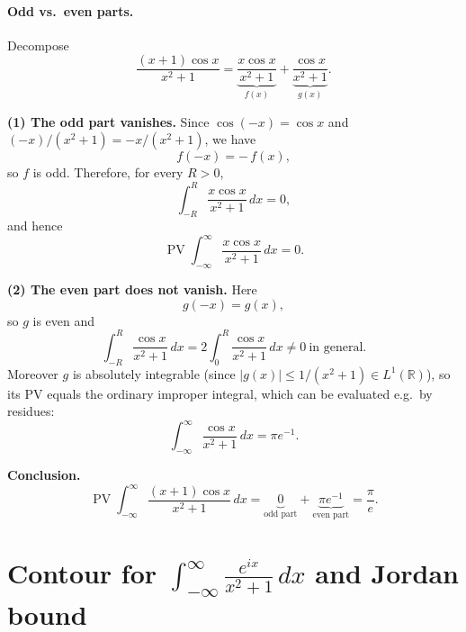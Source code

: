 \documentclass[12pt,a4paper]{article}
\begin{document}
\paragraph{Odd vs.\ even parts.}
Decompose
\[
\frac{(x+1)\cos x}{x^{2}+1}
=\underbrace{\frac{x\cos x}{x^{2}+1}}_{\displaystyle f(x)}
+\underbrace{\frac{\cos x}{x^{2}+1}}_{\displaystyle g(x)}.
\]

\noindent
\textbf{(1) The odd part vanishes.}
Since \(\cos(-x)=\cos x\) and \((-x)/(x^{2}+1)=-x/(x^{2}+1)\), we have
\[
f(-x)=-\,f(x),
\]
so \(f\) is odd. Therefore, for every \(R>0\),
\[
\int_{-R}^{R}\frac{x\cos x}{x^{2}+1}\,dx=0,
\]
and hence
\[
\operatorname{PV}\int_{-\infty}^{\infty}\frac{x\cos x}{x^{2}+1}\,dx=0.
\]

\noindent
\textbf{(2) The even part does not vanish.}
Here
\[
g(-x)=g(x),
\]
so \(g\) is even and
\[
\int_{-R}^{R}\frac{\cos x}{x^{2}+1}\,dx
=2\int_{0}^{R}\frac{\cos x}{x^{2}+1}\,dx \neq 0 \ \text{in general}.
\]
Moreover \(g\) is absolutely integrable (since \(|g(x)|\le 1/(x^{2}+1)\in L^{1}(\mathbb R)\)), so its PV equals the ordinary improper integral, which can be evaluated e.g.\ by residues:
\[
\int_{-\infty}^{\infty}\frac{\cos x}{x^{2}+1}\,dx=\pi e^{-1}.
\]

\noindent
\textbf{Conclusion.}
\[
\operatorname{PV}\int_{-\infty}^{\infty}\frac{(x+1)\cos x}{x^{2}+1}\,dx
=\underbrace{0}_{\text{odd part}}
+\underbrace{\pi e^{-1}}_{\text{even part}}
=\frac{\pi}{e}.
\]

\section*{Contour for \(\displaystyle \int_{-\infty}^{\infty}\frac{e^{ix}}{x^{2}+1}\,dx\) and Jordan bound}
\end{document}

